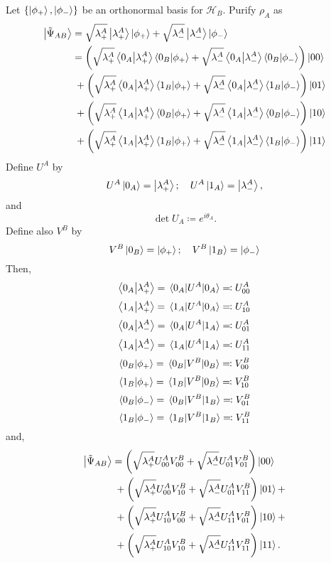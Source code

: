 \documentclass[12pt]{article}
\begin{document}
Let $\{\ket{\phi_+}, \ket{\phi_-}\}$ be an orthonormal basis for $\mathcal{H}_B$. Purify $\rho_A$ as
\begin{align*}
    \ket{\tilde{\Psi}_{AB}} &= \sqrt{\lambda_+^A}\ket{\lambda_+^A}\ket{\phi_+} + \sqrt{\lambda_-^A}\ket{\lambda_-^A}\ket{\phi_-} \\
    &= \left(\sqrt{\lambda_+^A}\braket{0_A}{\lambda_+^A}\braket{0_B}{\phi_+} + \sqrt{\lambda_-^A}\braket{0_A}{\lambda_-^A}\braket{0_B}{\phi_-}\right)\ket{00} \\
    &\; + \left(\sqrt{\lambda_+^A}\braket{0_A}{\lambda_+^A}\braket{1_B}{\phi_+} + \sqrt{\lambda_-^A}\braket{0_A}{\lambda_-^A}\braket{1_B}{\phi_-}\right)\ket{01} \\
    &\; + \left(\sqrt{\lambda_+^A}\braket{1_A}{\lambda_+^A}\braket{0_B}{\phi_+} + \sqrt{\lambda_-^A}\braket{1_A}{\lambda_-^A}\braket{0_B}{\phi_-}\right)\ket{10} \\
    &\; + \left(\sqrt{\lambda_+^A}\braket{1_A}{\lambda_+^A}\braket{1_B}{\phi_+} + \sqrt{\lambda_-^A}\braket{1_A}{\lambda_-^A}\braket{1_B}{\phi_-}\right)\ket{11} \\
\end{align*}
Define $U^A$ by
\[ U^A\ket{0_A} = \ket{\lambda_+^A}; \quad U^A\ket{1_A} = \ket{\lambda_-^A}, \]
and
\[ \det U_A \coloneq e^{i\theta_A}. \]
Define also $V^B$ by
\[ V^B\ket{0_B} = \ket{\phi_+}; \quad V^B\ket{1_B} = \ket{\phi_-}  \]
Then,
\[ \braket{0_A}{\lambda_+^A} = \mel{0_A}{U^A}{0_A} \eqqcolon U_{00}^A \]
\[ \braket{1_A}{\lambda_+^A} = \mel{1_A}{U^A}{0_A} \eqqcolon U_{10}^A \]
\[ \braket{0_A}{\lambda_-^A} = \mel{0_A}{U^A}{1_A} \eqqcolon U_{01}^A \]
\[ \braket{1_A}{\lambda_-^A} = \mel{1_A}{U^A}{1_A} \eqqcolon U_{11}^A \]
\[ \braket{0_B}{\phi_+} = \mel{0_B}{V^B}{0_B} \eqqcolon V_{00}^B \]
\[ \braket{1_B}{\phi_+} = \mel{1_B}{V^B}{0_B} \eqqcolon V_{10}^B \]
\[ \braket{0_B}{\phi_-} = \mel{0_B}{V^B}{1_B} \eqqcolon V_{01}^B \]
\[ \braket{1_B}{\phi_-} = \mel{1_B}{V^B}{1_B} \eqqcolon V_{11}^B \]
and,
\begin{align*}
    \ket{\tilde{\Psi}_{AB}} &= \left(\sqrt{\lambda_+^A}U_{00}^AV_{00}^B + \sqrt{\lambda_-^A}U_{01}^AV_{01}^B\right)\ket{00} \\
    &\; + \left(\sqrt{\lambda_+^A}U_{00}^AV_{10}^B + \sqrt{\lambda_-^A}U_{01}^AV_{11}^B\right)\ket{01} + \\
    &\; + \left(\sqrt{\lambda_+^A}U_{10}^AV_{00}^B + \sqrt{\lambda_-^A}U_{11}^AV_{01}^B\right)\ket{10} + \\ 
    &\; + \left(\sqrt{\lambda_+^A}U_{10}^AV_{10}^B + \sqrt{\lambda_-^A}U_{11}^AV_{11}^B\right)\ket{11}.
\end{align*}
\end{document}
